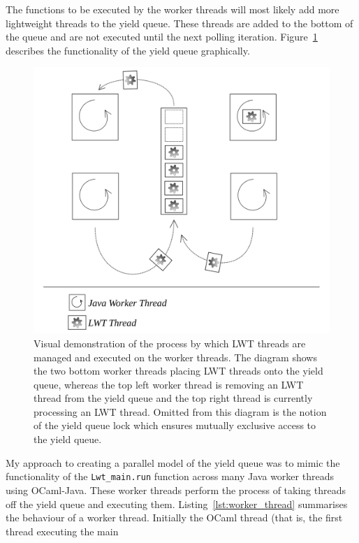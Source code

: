 \documentclass[12pt,twoside,notitlepage]{report}
\begin{document}
The functions to be executed by the worker threads will most likely add more lightweight threads to the yield queue. These threads are added to the bottom of the queue and are not executed until the next polling iteration.
Figure~\ref{fig:yield_queue} describes the functionality of the yield queue graphically.
\begin{figure}[h!]
\includegraphics[width=\linewidth]{yield_queue}
\caption[Yield Queue Diagram]{Visual demonstration of the process by which LWT threads are managed and executed on the worker threads. The diagram shows the two bottom worker threads placing LWT threads onto the yield queue, whereas the top left worker
thread is removing an LWT thread from the yield queue and the top right thread is currently processing an LWT thread. Omitted from this diagram is the notion of the yield queue lock which ensures mutually exclusive access to the yield
queue.}
\label{fig:yield_queue}
\end{figure}
%
%
My approach to creating a parallel model of the yield queue was to mimic the functionality of the {\tt Lwt\_main.run} function across many Java worker threads using OCaml-Java. These worker threads perform the process of
taking threads off the yield queue and executing them. Listing~\ref{lst:worker_thread} summarises the behaviour of a worker thread. Initially the OCaml thread (that is, the first thread executing the main
\end{document}
